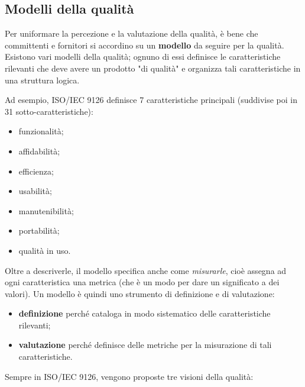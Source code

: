 \documentclass[a4paper]{article}
\begin{document}
		
	\subsection{Modelli della qualità}

		
Per uniformare la percezione e la valutazione della qualità, è bene che committenti e fornitori si accordino su un \textbf{modello} da seguire per la qualità. Esistono vari modelli della qualità; ognuno di essi definisce le caratteristiche rilevanti che deve avere un prodotto "di qualità" e organizza tali caratteristiche in una struttura logica.
		
Ad esempio, ISO/IEC 9126 definisce 7 caratteristiche principali (suddivise poi in 31 sotto-caratteristiche):
		
	\begin{itemize}
		
			
	\item funzionalità;
			
	\item affidabilità;
			
	\item efficienza;
			
	\item usabilità;
			
	\item manutenibilità;
			
	\item portabilità;
			
	\item qualità in uso.
		
	\end{itemize}

		
Oltre a descriverle, il modello specifica anche come \emph{misurarle}, cioè assegna ad ogni caratteristica una metrica (che è un modo per dare un significato a dei valori). Un modello è quindi uno strumento di definizione e di valutazione:
		
	\begin{itemize}
		
			
	\item \textbf{definizione} perché cataloga in modo sistematico delle caratteristiche rilevanti;
			
	\item \textbf{valutazione} perché definisce delle metriche per la misurazione di tali caratteristiche.
		
	\end{itemize}

		
Sempre in ISO/IEC 9126, vengono proposte tre visioni della qualità:
		
\end{document}
